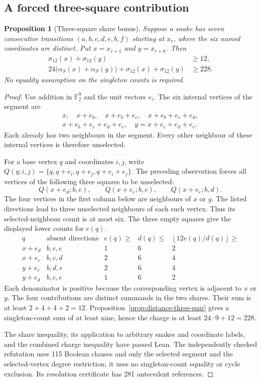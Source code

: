 \documentclass[11pt,a4paper]{article}
\newtheorem{proposition}[theorem]{Proposition}
\theoremstyle{definition}
\theoremstyle{remark}
\begin{document}
\subsection{A forced three-square contribution}
\begin{proposition}[Three-square share bonus]\label{prop:three-square-bonus}
Suppose a snake has seven consecutive transitions $(a,b,c,d,e,b,f)$ starting at $x_r$, where the six named coordinates are distinct. Put $x=x_{r+1}$ and $y=x_{r+6}$. Then
\[
\begin{aligned}
\sigma_{12}(x)+\sigma_{12}(y)&\ge12,\\
24\bigl(\alpha_S(x)+\alpha_S(y)\bigr)+\sigma_{12}(x)+\sigma_{12}(y)&\ge228.
\end{aligned}
\]
No equality assumption on the singleton counts is required.
\end{proposition}
\begin{proof}
Use addition in $\mathbb F_2^9$ and the unit vectors $e_i$. The six internal vertices of the segment are
\[
\begin{gathered}
x,\quad x+e_b,\quad x+e_b+e_c,\quad x+e_b+e_c+e_d,\\
x+e_b+e_c+e_d+e_e,\quad y=x+e_c+e_d+e_e.
\end{gathered}
\]
Each already has two neighbours in the segment. Every other neighbour of these internal vertices is therefore unselected.

For a base vertex $q$ and coordinates $i,j$, write
$Q(q;i,j)=\{q,q+e_i,q+e_j,q+e_i+e_j\}$.
The preceding observation forces all vertices of the following three squares to be unselected:
\[
Q(x+e_d;b,e),\qquad Q(x+e_e;b,c),\qquad Q(x+e_e;b,d).
\]
The four vertices in the first column below are neighbours of $x$ or $y$. The listed directions lead to three unselected neighbours of each such vertex. Thus its selected-neighbour count is at most six. The three empty squares give the displayed lower counts for $e(q)$.
\[
\begin{array}{c|c|c|c|c}
q&\text{absent directions}&e(q)\ge&d(q)\le&
\left\lfloor12e(q)/d(q)\right\rfloor\ge\\\hline
x+e_d&b,c,e&1&6&2\\
x+e_e&b,c,d&2&6&4\\
y+e_c&b,d,e&2&6&4\\
y+e_d&b,c,e&1&6&2
\end{array}
\]
Each denominator is positive because the corresponding vertex is adjacent to $x$ or $y$. The four contributions are distinct summands in the two shares. Their sum is at least $2+4+4+2=12$. Proposition~\ref{prop:distance-three-pair} gives a singleton-count sum of at least nine, hence the charge is at least $24\cdot9+12=228$.

The share inequality, its application to arbitrary snakes and coordinate labels, and the combined charge inequality have passed Lean. The independently checked refutation uses 115 Boolean clauses and only the selected segment and the selected-vertex degree restriction; it uses no singleton-count equality or cycle exclusion. Its resolution certificate has 281 antecedent references.
\end{proof}
\end{document}
